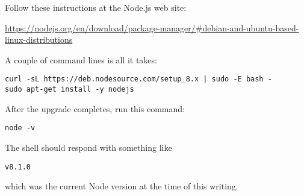  Follow these instructions at the Node.js web site:
 
 \url{https://nodejs.org/en/download/package-manager/#debian-and-ubuntu-based-linux-distributions}

A couple of command lines is all it takes:

\begin{verbatim}
curl -sL https://deb.nodesource.com/setup_8.x | sudo -E bash -
sudo apt-get install -y nodejs
\end{verbatim}

After the upgrade completes, run this command:

\begin{verbatim}
node -v
\end{verbatim}

The shell should respond with something like

\begin{verbatim}
v8.1.0
\end{verbatim}

which was the current Node version at the time of this writing.

